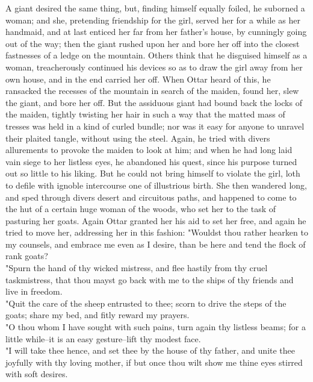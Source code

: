 \documentclass[10pt,a4paper]{report}
\begin{document}
A giant desired the same thing, but, finding himself equally foiled, he suborned a woman; and she, pretending friendship for the girl, served her for a while as her handmaid, and at last enticed her far from her father's house, by cunningly going out of the way; then the giant rushed upon her and bore her off into the closest fastnesses of a ledge on the mountain. Others think that he disguised himself as a woman, treacherously continued his devices so as to draw the girl away from her own house, and in the end carried her off. When Ottar heard of this, he ransacked the recesses of the mountain in search of the maiden, found her, slew the giant, and bore her off. But the assiduous giant had bound back the locks of the maiden, tightly twisting her hair in such a way that the matted mass of tresses was held in a kind of curled bundle; nor was it easy for anyone to unravel their plaited tangle, without using the steel. Again, he tried with divers allurements to provoke the maiden to look at him; and when he had long laid vain siege to her listless eyes, he abandoned his quest, since his purpose turned out so little to his liking. But he could not bring himself to violate the girl, loth to defile with ignoble intercourse one of illustrious birth. She then wandered long, and sped through divers desert and circuitous paths, and happened to come to the hut of a certain huge woman of the woods, who set her to the task of pasturing her goats. Again Ottar granted her his aid to set her free, and again he tried to move her, addressing her in this fashion: "Wouldst thou rather hearken to my counsels, and embrace me even as I desire, than be here and tend the flock of rank goats?\\

"Spurn the hand of thy wicked mistress, and flee hastily from thy cruel taskmistress, that thou mayst go back with me to the ships of thy friends and live in freedom.\\

"Quit the care of the sheep entrusted to thee; scorn to drive the steps of the goats; share my bed, and fitly reward my prayers.\\

"O thou whom I have sought with such pains, turn again thy listless beams; for a little while--it is an easy gesture--lift thy modest face.\\

"I will take thee hence, and set thee by the house of thy father, and unite thee joyfully with thy loving mother, if but once thou wilt show me thine eyes stirred with soft desires.\\
\end{document}
